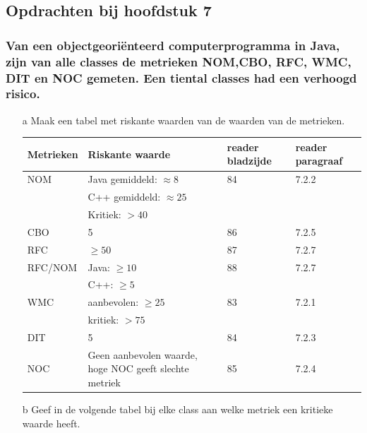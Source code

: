 \documentclass[a4paper,titlepage]{artikel1}
\begin{document}
   \subsection{Opdrachten bij hoofdstuk 7}
   \subsubsection[Opdracht 1]{Van een objectgeori\"{e}nteerd computerprogramma in Java, zijn van alle classes de metrieken NOM,CBO, RFC, WMC, DIT en NOC gemeten. Een tiental classes had een verhoogd risico.}
   \begin{itemize}
     \item[a] Maak een tabel met riskante waarden van de waarden van de metrieken.
       \begin{center}
         \begin{tabular}{|l|p{5cm}|l|l|}
           \hline
           Metrieken & Riskante waarde & reader bladzijde & reader paragraaf\\
           \hline
           NOM & Java gemiddeld: $\approx8$ & 84 & 7.2.2 \\
           & C++ gemiddeld: $\approx25$ & & \\
           & Kritiek: $>40$ & & \\
           \hline
           CBO & 5 & 86 & 7.2.5 \\
           \hline
           RFC & $\geq50$ & 87 & 7.2.7 \\
           \hline 
           RFC/NOM & Java: $\geq10$ & 88 & 7.2.7 \\
           & C++: $\geq5$ & & \\
           \hline
           WMC & aanbevolen: $\geq25$ & 83 & 7.2.1 \\
           & kritiek: $>75$ & & \\
           \hline
           DIT & 5 & 84  & 7.2.3 \\
           \hline
           NOC & Geen aanbevolen waarde, hoge NOC geeft slechte metriek & 85  & 7.2.4  \\
           \hline
         \end{tabular}
       \end{center}
     \item[b] Geef in de volgende tabel bij elke class aan welke metriek een kritieke waarde heeft. \\
       \begin{center}
       \begin{tabular}{|l|l|l|l|l|l|l|l|}
         \hline

\end{tabular}
\end{center}
\end{itemize}
\end{document}
